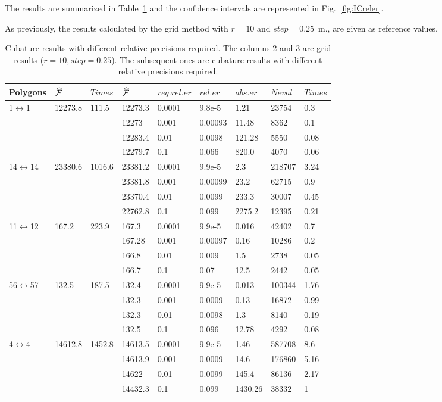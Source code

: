 The results are summarized in Table~\ref{array:cubprec}
and 
the confidence intervals are represented in Fig.~\ref{fig:ICreler}.

As previously,  the results calculated by the grid method
 with $r=10$ and $step=0.25$~m.,
are given as reference values.

 
\begin{table}
\footnotesize
\caption{\label{array:cubprec} Cubature results with 
  different relative precisions required.
The columns 2 and 3 are grid results ($r=10,step=0.25$).
The subsequent ones are cubature results with different 
relative precisions required.
}
\begin{center}
\begin{tabular}{|p{1.2cm}|p{1cm}|p{0.8cm}|p{1cm}|p{1.5cm}|p{1.2cm}|p{1cm}|p{1cm}|p{0.8cm}|}
\hline
\textbf{Polygons} 
&  $\widehat{{\cal F}}$  
& $Times$
&  $\widehat{{\cal F}}$
& $req.rel.er$
& $rel.er$
& $abs.er$
&  $Neval$
& $Times$
 \\ \hline
1$\leftrightarrow$1  &
12273.8   & 111.5 &
12273.3 & 0.0001 & 9.8e-5 & 1.21 &23754 & 0.3 \\
 & & &
12273 & 0.001& 0.00093 & 11.48 & 8362 & 0.1\\
 & & &
12283.4 & 0.01 & 0.0098 & 121.28 & 5550 & 0.08\\
 & & &
12279.7 & 0.1 & 0.066 & 820.0 & 4070 & 0.06\\
 \hline
14$\leftrightarrow$14  &
23380.6  & 1016.6 &
 23381.2 & 0.0001 & 9.9e-5 & 2.3 &  218707 & 3.24 \\
 & & &
23381.8 &  0.001& 0.00099 & 23.2 & 62715 & 0.9\\
 & & &
23370.4 & 0.01 & 0.0099 & 233.3 & 30007 & 0.45\\
 & & &
22762.8 & 0.1 & 0.099 & 2275.2 & 12395 & 0.21\\
 \hline
11$\leftrightarrow$12  &
167.2   & 223.9 &
167.3 & 0.0001 & 9.9e-5 & 0.016 & 42402 & 0.7\\
 & & &
167.28 &  0.001& 0.00097 & 0.16 &  10286 & 0.2\\
 & & &
166.8 & 0.01 &0.009 & 1.5 & 2738 & 0.05\\
 & & &
166.7 &0.1 & 0.07 & 12.5 & 2442 & 0.05\\
 \hline
56$\leftrightarrow$57  &
132.5  & 187.5&
132.4 & 0.0001 & 9.9e-5 & 0.013 &  100344 & 1.76\\
 & & &
132.3 &  0.001&  0.0009 & 0.13 & 16872 & 0.99\\
 & & &
132.3 & 0.01 & 0.0098 & 1.3 & 8140 & 0.19\\
 & & &
132.5 &0.1 & 0.096 & 12.78 &  4292 & 0.08\\
\hline
4$\leftrightarrow$4 &
 14612.8 & 1452.8  &
14613.5 & 0.0001 & 9.9e-5 & 1.46 & 587708 & 8.6\\
 & & &
14613.9 &  0.001& 0.0009 & 14.6 & 176860 & 5.16\\
 & & &
14622 & 0.01 &  0.0099 & 145.4 & 86136 & 2.17\\
 & & &
14432.3 &0.1 & 0.099 & 1430.26 & 38332 & 1\\
 \hline


\end{tabular}
\end{center}
\normalsize
\end{table}


